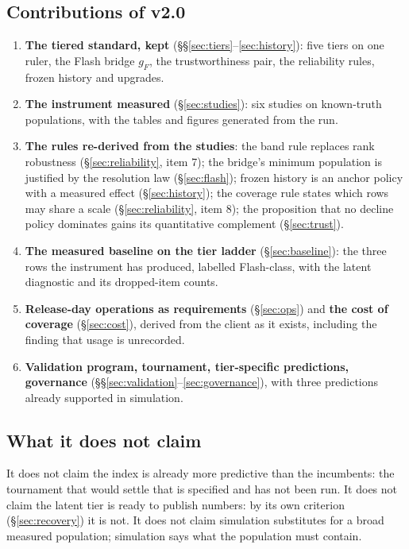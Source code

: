 \documentclass[11pt]{article}
\theoremstyle{definition}
\begin{document}
\subsection{Contributions of v2.0}
\begin{enumerate}[leftmargin=1.6em,itemsep=2pt]
\item \textbf{The tiered standard, kept} (\S\S\ref{sec:tiers}--\ref{sec:history}): five tiers on one ruler, the Flash bridge $g_F$, the trustworthiness pair, the reliability rules, frozen history and upgrades.
\item \textbf{The instrument measured} (\S\ref{sec:studies}): six studies on known-truth populations, with the tables and figures generated from the run.
\item \textbf{The rules re-derived from the studies}: the band rule replaces rank robustness (\S\ref{sec:reliability}, item 7); the bridge's minimum population is justified by the resolution law (\S\ref{sec:flash}); frozen history is an anchor policy with a measured effect (\S\ref{sec:history}); the coverage rule states which rows may share a scale (\S\ref{sec:reliability}, item 8); the proposition that no decline policy dominates gains its quantitative complement (\S\ref{sec:trust}).
\item \textbf{The measured baseline on the tier ladder} (\S\ref{sec:baseline}): the three rows the instrument has produced, labelled Flash-class, with the latent diagnostic and its dropped-item counts.
\item \textbf{Release-day operations as requirements} (\S\ref{sec:ops}) and \textbf{the cost of coverage} (\S\ref{sec:cost}), derived from the client as it exists, including the finding that usage is unrecorded.
\item \textbf{Validation program, tournament, tier-specific predictions, governance} (\S\S\ref{sec:validation}--\ref{sec:governance}), with three predictions already supported in simulation.
\end{enumerate}

\subsection{What it does not claim}
It does not claim the index is already more predictive than the incumbents: the tournament that would settle that is specified and has not been run. It does not claim the latent tier is ready to publish numbers: by its own criterion (\S\ref{sec:recovery}) it is not. It does not claim simulation substitutes for a broad measured population; simulation says what the population must contain.
\end{document}
